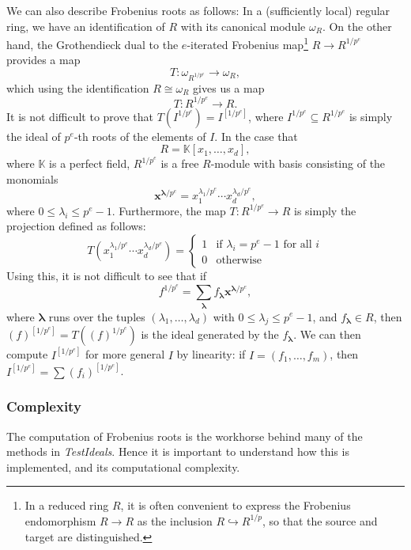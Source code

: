\documentclass{amsart}
\renewcommand{\leq}{\leqslant}
\begin{document}
We can also describe Frobenius roots as follows:  In a (sufficiently local) regular ring, we have an identification of $R$ with its canonical module $\omega_R$.
On the other hand, the Grothendieck dual to the $e$-iterated Frobenius map\footnote{In a reduced ring $R$, it is often convenient to express the Frobenius endomorphism $R \to R$ as the inclusion $R \hookrightarrow R^{1/p}$, so that the source and target  are distinguished.} $R \to R^{1/p^e}$ provides a map
\begin{equation}
\label{eq.DualToFrobenius}
T : \omega_{R^{1/p^e}} \to \omega_R,
\end{equation}
which using the identification $R \cong \omega_R$ gives us a map
\[
T : R^{1/p^e} \to R.
\]
It is not difficult to prove that
$T(I^{1/p^e})=I^{[1/p^e]}$,
where $I^{1/p^e} \subseteq R^{1/p^e}$ is simply the ideal of $p^e$-th roots of the elements of $I$.
In the case that
\[
R = \mathbb{K}[x_1, \ldots, x_d],
\]
where $\mathbb{K}$ is a perfect field,
$R^{1/p^e}$ is a free $R$-module with basis consisting of the monomials
\[
\mathbf{x}^{\boldsymbol{\lambda}/p^e}= x_1^{\lambda_1/p^e} \cdots x_d^{\lambda_d/p^e},
\]
where $0 \leq \lambda_i \leq p^e-1$.
Furthermore, the map $T : R^{1/p^e} \to R$ is simply the projection defined as follows:
\[
T(x_1^{\lambda_1/p^e} \cdots x_d^{\lambda_d/p^e}) = \left\{ \begin{array}{rl} 1 &\text{if } \lambda_i = p^{e}-1 \text{ for all }i \\ 0 & \text{otherwise}  \end{array} \right.
\]
Using this, it is not difficult to see that if
\begin{equation}
\label{eqn1}
f^{1/p^e} = \sum_{\boldsymbol{\lambda}} f_{\boldsymbol{\lambda}} \mathbf{x}^{\boldsymbol{\lambda} / p^e},
\end{equation}
where $\boldsymbol{\lambda}$ runs over the tuples $(\lambda_1, \dots, \lambda_d)$ with $0 \leq \lambda_j \leq p^e-1$, and $f_{\boldsymbol{\lambda}} \in R$, then
$(f)^{[1/p^e]} = T( (f)^{1/p^e})$ is the ideal generated by the $f_{\boldsymbol{\lambda}}$.
We can then compute $I^{[1/p^e]}$ for more general $I$ by linearity: if $I=(f_1,\ldots,f_m)$, then $I^{[1/p^e]}= \sum(f_i)^{[1/p^e]}$.

\subsubsection{Complexity}
The computation of Frobenius roots is the workhorse behind many of the methods in \emph{TestIdeals}.
Hence it is important to understand how this is implemented, and its computational complexity.
\end{document}
